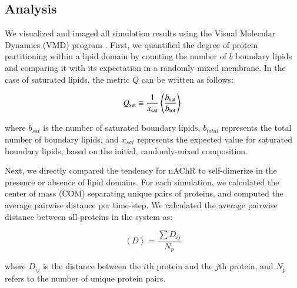 \documentclass[final,3p,times,twocolumn]{elsarticle}
\newcommand{\bsat}{b_{\mathrm{sat}}}
\newcommand{\qsat}{Q_{\mathrm{sat}}}
\newcommand{\xsat}{x_{\mathrm{sat}}}
\newcommand{\nbound}{b_{\mathrm{tot}}}
\begin{document}
\subsection{Analysis}
We visualized and imaged all simulation results using the Visual Molecular Dynamics (VMD) program \cite{HUMP96}. First, we quantified the degree of protein partitioning within a lipid domain by counting the number of $b$ boundary lipids and comparing it with its expectation in a randomly mixed membrane. In the case of saturated lipids, the metric $Q$ can be written as follows:


\begin{equation}
\qsat\equiv \frac{1}{\xsat}\left\langle\frac{  \bsat }{\nbound }\right\rangle\\
\label{eq:Annular}
\end{equation}


where $b_{sat}$ is the number of saturated boundary lipids, $b_{total}$ represents the total number of boundary lipids, and $x_{sat}$ represents the expected value for saturated boundary lipids, based on the initial, randomly-mixed composition.   



  

Next, we directly compared the tendency for nAChR to self-dimerize in the presence or absence of lipid domains. For each simulation, we calculated the center of mass (COM) separating unique pairs of proteins, and computed the average pairwise distance per time-step. We calculated the average pairwise distance between all proteins in the system as:    


\begin{equation}\label{eq:dimer}
\left\langle D \right\rangle = \frac{\sum D_{ij}}{N_{p}}
\end{equation}

where $D_{ij}$ is the distance between the $i$th protein and the $j$th protein, and $N_{p}$ refers to the number of unique protein pairs. 
\end{document}
